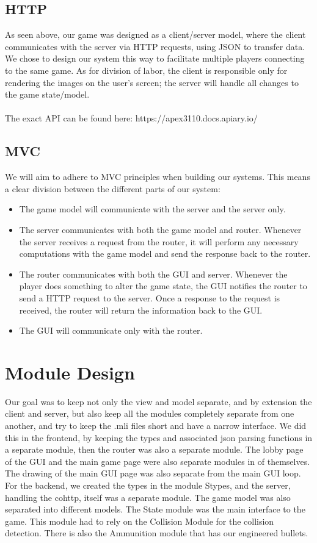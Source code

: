 \documentclass{article}
\begin{document}
        \subsection{HTTP}
       	As seen above, our game was designed as a client/server model, where the client communicates with the server via HTTP requests, using JSON to transfer data. We chose to design our system this way to facilitate multiple players connecting to the same game. As for division of labor, the client is responsible only for rendering the images on the user's screen; the server will handle all changes to the game state/model. \\
	\\
	The exact API can be found here: https://apex3110.docs.apiary.io/

	
	\subsection{MVC}
	We will aim to adhere to MVC principles when building our systems. This means a clear division between the different parts of our system:
	\begin{itemize}
		\item The game model will communicate with the server and the server only.
		\item The server communicates with both the game model and router. Whenever the server receives a request from the router, it will perform any necessary computations with the game model and send the response back to the router.
		\item The router communicates with both the GUI and server. Whenever the player does something to alter the game state, the GUI notifies the router to send a HTTP request to the server. Once a response to the request is received, the router will return the information back to the GUI.
		\item The GUI will communicate only with the router.
	\end{itemize}

    \section{Module Design}

        Our goal was to keep not only the view and model separate, and by extension the client and server, but also keep all the modules completely separate from one another, and try to keep the .mli files short and have a narrow interface. We did this in the frontend, by keeping the types and associated json parsing functions in a separate module, then the router was also a separate module. The lobby page of the GUI and the main game page were also separate modules in of themselves. The drawing of the main GUI page was also separate from the main GUI loop. For the backend, we created the types in the module Stypes, and the server, handling the cohttp, itself was a separate module. The game model was also separated into different models. The State module was the main interface to the game. This module had to rely on the Collision Module for the collision detection. There is also the Ammunition module that has our engineered bullets.
\end{document}
